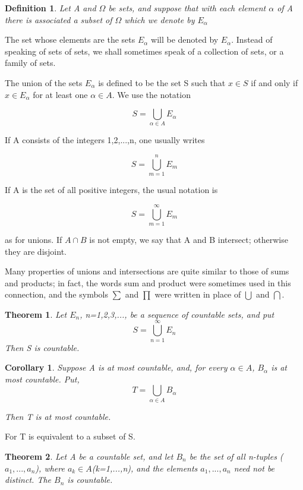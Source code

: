 \documentclass{article}
\newtheorem{defi}{Definition}
\newtheorem{theo}{Theorem}
\newtheorem{coro}{Corollary}
\begin{document}
\begin{defi}
	Let A and $\Omega$ be sets, and suppose that with each element $\alpha$ of A there is associated a subset of $\Omega$ which we denote by $ E_\alpha $
\end{defi}

The set whose elements are the sets $ E_\alpha $ will be denoted by {$ E_\alpha $}. Instead of speaking of sets of sets, we shall sometimes speak of a collection of sets, or a family of sets.

The union of the sets $ E_\alpha $ is defined to be the set S such that $ x\in S $ if and only if $ x\in E_\alpha $ for at least one $ \alpha\in A $. We use the notation

\[
S=\bigcup_{\alpha\in A}E_\alpha
\]

If A consists of the integers 1,2,...,n, one usually writes

\[
S=\bigcup^n_{m=1}E_m
\]

If A is the set of all positive integers, the usual notation is 

\[
S=\bigcup^{\infty}_{m=1}E_m
\]

as for unions. If $ A\cap B $ is not empty, we say that A and B intersect; otherwise they are disjoint.

Many properties of unions and intersections are quite similar to those of sums and products; in fact, the words sum and product were sometimes used in this connection, and the symbols $ \sum $ and $ \prod $ were written in place of $ \bigcup $ and $ \bigcap $.

\begin{theo}
	Let {$ E_n $}, n=1,2,3,..., be a sequence of countable sets, and put 
	\[
	S=\bigcup^{\infty}_{n=1}E_n
	\]
	Then S is countable.
\end{theo}

\begin{coro}
	Suppose A is at most countable, and, for every $ \alpha\in A $, $ B_\alpha $ is at most countable. Put, 
	\[
	T=\bigcup_{\alpha\in A}B_\alpha
	\]
	
	Then T is at most countable.
\end{coro}

For T is equivalent to a subset of S.

\begin{theo}
	 Let A be a countable set, and let $ B_n $ be the set of all n-tuples ($ a_1,...,a_n $), where $ a_k\in A $(k=1,...,n), and the elements $ a_1,...,a_n $ need not be distinct. The $ B_n $ is countable.
\end{theo}
\end{document}

